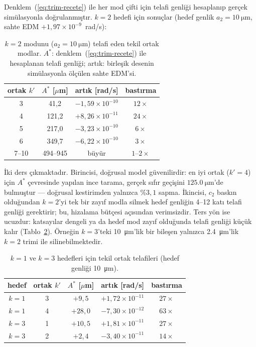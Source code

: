 \documentclass[preprint,12pt]{elsarticle}
\begin{document}
Denklem~(\ref{eq:trim-recete}) ile her mod çifti için telafi genliği
hesaplanıp gerçek simülasyonla doğrulanmıştır. $k=2$ hedefi için sonuçlar
(hedef genlik $a_2=\SI{10}{\micro\meter}$, sahte EDM
$+1{,}97\times10^{-9}$~rad/s):

\begin{table}[h]
\centering
\caption{$k=2$ modunu ($a_2=\SI{10}{\micro\meter}$) telafi eden tekil
ortak modlar. $A^*$: denklem~(\ref{eq:trim-recete}) ile hesaplanan telafi
genliği; artık: birleşik desenin simülasyonla ölçülen sahte EDM'si.}
\label{tab:k2ortak}
\begin{tabular}{cccc}
\toprule
ortak $k'$ & $A^*$ [$\mu$m] & artık [rad/s] & bastırma \\
\midrule
3  & 41{,}2  & $-1{,}59\times10^{-10}$ & $12\times$ \\
4  & 121{,}2 & $+8{,}26\times10^{-11}$ & $24\times$ \\
5  & 217{,}0 & $-3{,}23\times10^{-10}$ & $6\times$  \\
6  & 349{,}7 & $-6{,}22\times10^{-10}$ & $3\times$  \\
7--10 & 494--945 & büyür & $1$--$2\times$ \\
\bottomrule
\end{tabular}
\end{table}

İki ders çıkmaktadır. Birincisi, doğrusal model güvenilirdir: en iyi ortak
($k'=4$) için $A^*$ çevresinde yapılan ince tarama, gerçek sıfır geçişini
$\SI{125.0}{\micro\meter}$'de bulmuştur — doğrusal kestirimden yalnızca
$\%3{,}1$ sapma. İkincisi, $c_2$ baskın olduğundan $k=2$'yi tek bir zayıf
modla silmek hedef genliğin 4--12 katı telafi genliği gerektirir; bu,
hizalama bütçesi açısından verimsizdir. Ters yön ise ucuzdur: katsayılar
dengeli ya da hedef mod zayıf olduğunda telafi genliği küçük kalır
(Tablo~\ref{tab:k13ortak}). Örneğin $k=3$'teki \SI{10}{\micro\meter}'lik
bir bileşen yalnızca \SI{2.4}{\micro\meter}'lik $k=2$ trimi ile
silinebilmektedir.

\begin{table}[h]
\centering
\caption{$k=1$ ve $k=3$ hedefleri için tekil ortak telafileri
(hedef genliği \SI{10}{\micro\meter}).}
\label{tab:k13ortak}
\begin{tabular}{ccccc}
\toprule
hedef & ortak $k'$ & $A^*$ [$\mu$m] & artık [rad/s] & bastırma \\
\midrule
$k=1$ & 3 & $+9{,}5$  & $+1{,}72\times10^{-11}$ & $27\times$ \\
$k=1$ & 4 & $+28{,}0$ & $-7{,}30\times10^{-12}$ & $63\times$ \\
$k=3$ & 1 & $+10{,}5$ & $+1{,}81\times10^{-11}$ & $27\times$ \\
$k=3$ & 2 & $+2{,}4$  & $-3{,}40\times10^{-11}$ & $14\times$ \\
\bottomrule
\end{tabular}
\end{table}
\end{document}
